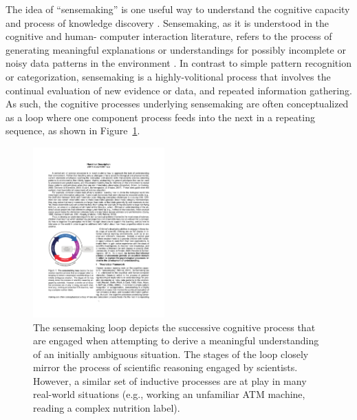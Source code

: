 \documentclass[man,floatsintext]{apa6}
\begin{document}
The idea of ``sensemaking'' is one useful way to understand the cognitive capacity and process of knowledge discovery \cite{Renner:2011}. Sensemaking, as it is understood in the cognitive and human-
computer interaction literature, refers to the process of generating meaningful 
explanations or understandings for possibly incomplete or noisy data patterns in the 
environment \cite{Russell:1993,Klein:2006a,Klein:2006b}. In contrast to simple 
pattern recognition or categorization, sensemaking is a highly-volitional process that 
involves the continual evaluation of new evidence or data, and repeated information 
gathering. As such, the cognitive processes underlying sensemaking are often 
conceptualized as a loop where one component process feeds into the next in a 
repeating sequence, as shown in Figure~\ref{fig:sensemaking_loop}.

\begin{figure}[!h]
  \centering
  \includegraphics[width=0.45\textwidth]{figures/sensemaking_loop}
  \caption{The sensemaking loop depicts the successive cognitive process that are 
engaged when attempting to derive a meaningful understanding of an initially 
ambiguous situation. The stages of the loop closely mirror the process of scientific 
reasoning engaged by scientists. However, a similar set of inductive processes are 
at play in many real-world situations (e.g., working an unfamiliar ATM machine, 
reading a complex nutrition label).}
  \label{fig:sensemaking_loop}
\end{figure} 
\end{document}
